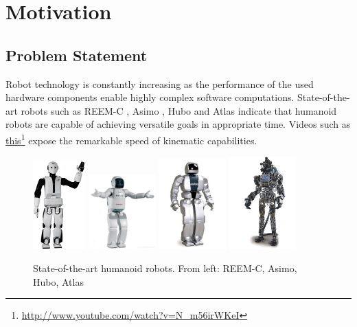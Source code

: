 \chapter{Motivation}
\label{chapter:introduction}
\section{Problem Statement}
Robot technology is constantly increasing as the performance of the used hardware components enable highly complex software computations. State-of-the-art robots such as REEM-C \cite{reemspec}, Asimo \cite{asimospec}, Hubo \cite{hubospec} and Atlas \cite{atlasspec} indicate that humanoid robots are capable of achieving versatile goals in appropriate time. Videos such as \href{http://www.youtube.com/watch?v=N_m56irWKeI}{this}\footnote{\url{http://www.youtube.com/watch?v=N_m56irWKeI}} expose the remarkable speed of kinematic capabilities.
\begin{figure}[h!]
  \centering
    \includegraphics[width=0.18\textwidth]{../figures/reemc2.jpg}
    \includegraphics[width=0.23\textwidth]{../figures/asimo2.jpg}
    \includegraphics[width=0.23\textwidth]{../figures/hubo.jpg}
    \includegraphics[width=0.23\textwidth]{../figures/atlas.jpg}
    \caption{State-of-the-art humanoid robots. From left: REEM-C, Asimo, Hubo, Atlas}
    \label{figclosestpointmesh}
\end{figure}
